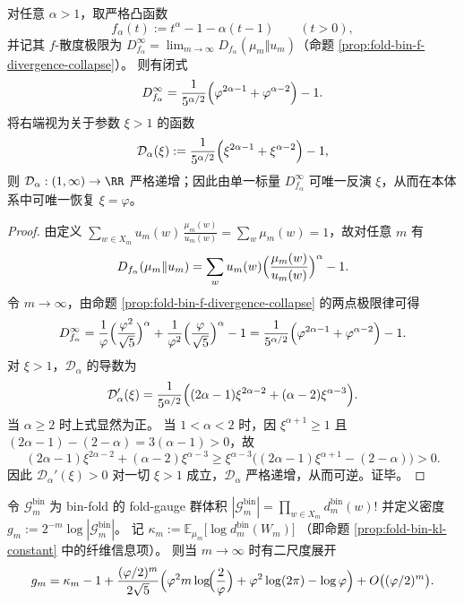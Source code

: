 \begin{proposition}\label{prop:fold-bin-phi-identifiable-power-divergence}
对任意 \(\alpha>1\)，取严格凸函数
\[
f_\alpha(t):=t^\alpha-1-\alpha(t-1)\qquad(t>0),
\]
并记其 \(f\)-散度极限为 \(D_{f_\alpha}^\infty=\lim_{m\to\infty}D_{f_\alpha}(\mu_m\Vert u_m)\)（命题 \ref{prop:fold-bin-f-divergence-collapse}）。
则有闭式
\[
D_{f_\alpha}^\infty
=\frac{1}{5^{\alpha/2}}\Bigl(\varphi^{2\alpha-1}+\varphi^{\alpha-2}\Bigr)-1.
\]
将右端视为关于参数 \(\xi>1\) 的函数
\[
\mathcal{D}_\alpha(\xi):=\frac{1}{5^{\alpha/2}}\Bigl(\xi^{2\alpha-1}+\xi^{\alpha-2}\Bigr)-1,
\]
则 \(\mathcal{D}_\alpha:(1,\infty)\to\RR\) 严格递增；因此由单一标量 \(D_{f_\alpha}^\infty\) 可唯一反演 \(\xi\)，从而在本体系中可唯一恢复 \(\xi=\varphi\)。
\end{proposition}
\begin{proof}
由定义 \(\sum_{w\in X_m}u_m(w)\,\frac{\mu_m(w)}{u_m(w)}=\sum_w \mu_m(w)=1\)，故对任意 \(m\) 有
\[
D_{f_\alpha}(\mu_m\Vert u_m)=\sum_{w}u_m(w)\Bigl(\frac{\mu_m(w)}{u_m(w)}\Bigr)^\alpha-1.
\]
令 \(m\to\infty\)，由命题 \ref{prop:fold-bin-f-divergence-collapse} 的两点极限律可得
\[
D_{f_\alpha}^\infty
=\frac{1}{\varphi}\Bigl(\frac{\varphi^2}{\sqrt5}\Bigr)^\alpha+\frac{1}{\varphi^2}\Bigl(\frac{\varphi}{\sqrt5}\Bigr)^\alpha-1
=\frac{1}{5^{\alpha/2}}\Bigl(\varphi^{2\alpha-1}+\varphi^{\alpha-2}\Bigr)-1.
\]
对 \(\xi>1\)，\(\mathcal{D}_\alpha\) 的导数为
\[
\mathcal{D}_\alpha'(\xi)=\frac{1}{5^{\alpha/2}}\Bigl((2\alpha-1)\xi^{2\alpha-2}+(\alpha-2)\xi^{\alpha-3}\Bigr).
\]
当 \(\alpha\ge 2\) 时上式显然为正。
当 \(1<\alpha<2\) 时，因 \(\xi^{\alpha+1}\ge 1\) 且
\(
(2\alpha-1)-(2-\alpha)=3(\alpha-1)>0
\)，故
\[
(2\alpha-1)\xi^{2\alpha-2}+(\alpha-2)\xi^{\alpha-3}
\ge \xi^{\alpha-3}\bigl((2\alpha-1)\xi^{\alpha+1}-(2-\alpha)\bigr)
>0.
\]
因此 \(\mathcal{D}_\alpha'(\xi)>0\) 对一切 \(\xi>1\) 成立，\(\mathcal{D}_\alpha\) 严格递增，从而可逆。证毕。
\end{proof}

\begin{proposition}\label{prop:fold-bin-gauge-density-two-scale}
令 \(\mathcal{G}^{\mathrm{bin}}_m\) 为 bin-fold 的 fold-gauge 群体积
\(
|\mathcal{G}^{\mathrm{bin}}_m|=\prod_{w\in X_m} d^{\mathrm{bin}}_m(w)!
\)
并定义密度 \(g_m:=2^{-m}\log|\mathcal{G}^{\mathrm{bin}}_m|\)。
记
\(
\kappa_m:=\mathbb{E}_{\mu_m}\bigl[\log d^{\mathrm{bin}}_m(W_m)\bigr]
\)
（即命题 \ref{prop:fold-bin-kl-constant} 中的纤维信息项）。
则当 \(m\to\infty\) 时有二尺度展开
\[
g_m=\kappa_m-1+\frac{(\varphi/2)^m}{2\sqrt5}\Bigl(\varphi^2 m\log\!\Bigl(\frac{2}{\varphi}\Bigr)+\varphi^2\log(2\pi)-\log\varphi\Bigr)+O\bigl((\varphi/2)^m\bigr).
\]
\end{proposition}

